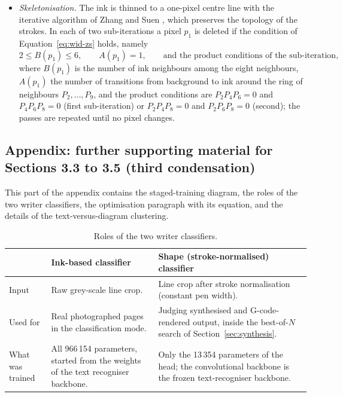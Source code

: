 \begin{itemize}
\item \emph{Skeletonisation.} The ink is thinned to a one-pixel centre line with the iterative algorithm of Zhang and Suen \cite{zhang1984}, which preserves the topology of the strokes. In each of two sub-iterations a pixel $p_1$ is deleted if the condition of Equation~\ref{eq:wid-zs} holds, namely
\begin{equation}
2\le B(p_1)\le6,\qquad A(p_1)=1,\qquad\text{and the product conditions of the sub-iteration,}
\label{eq:wid-zs}
\end{equation}
where $B(p_1)$ is the number of ink neighbours among the eight neighbours, $A(p_1)$ the number of transitions from background to ink around the ring of neighbours $P_2,\ldots,P_9$, and the product conditions are $P_2P_4P_6=0$ and $P_4P_6P_8=0$ (first sub-iteration) or $P_2P_4P_8=0$ and $P_2P_6P_8=0$ (second); the passes are repeated until no pixel changes.
\end{itemize}

\subsection{Appendix: further supporting material for Sections 3.3 to 3.5 (third condensation)}

This part of the appendix contains the staged-training diagram, the roles of the two writer classifiers, the optimisation paragraph with its equation, and the details of the text-versus-diagram clustering.

\begin{table}[h]
\centering
\fontsize{9.5}{11.5}\selectfont
\begin{tabularx}{\linewidth}{|p{3.3cm}|X|X|}
\hline
& \textbf{Ink-based classifier} & \textbf{Shape (stroke-normalised) classifier} \\
\hline
Input & Raw grey-scale line crop. & Line crop after stroke normalisation (constant pen width). \\
\hline
Used for & Real photographed pages in the classification mode. & Judging synthesised and G-code-rendered output, inside the best-of-$N$ search of Section~\ref{sec:synthesis}. \\
\hline
What was trained & All 966\,154 parameters, started from the weights of the text recogniser backbone. & Only the 13\,354 parameters of the head; the convolutional backbone is the frozen text-recogniser backbone. \\
\hline
\end{tabularx}
\caption{Roles of the two writer classifiers.}
\label{tab:wid-roles}
\end{table}

